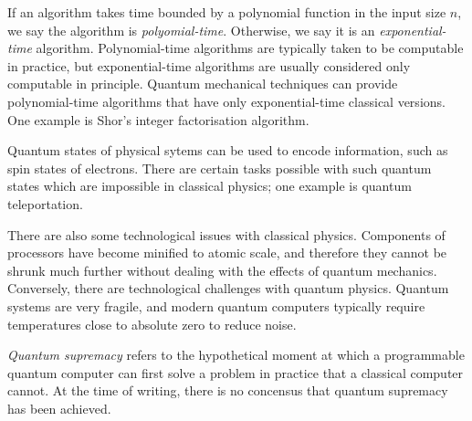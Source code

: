 If an algorithm takes time bounded by a polynomial function in the input size \( n \), we say the algorithm is \emph{polyomial-time}.
Otherwise, we say it is an \emph{exponential-time} algorithm.
Polynomial-time algorithms are typically taken to be computable in practice, but exponential-time algorithms are usually considered only computable in principle.
Quantum mechanical techniques can provide polynomial-time algorithms that have only exponential-time classical versions.
One example is Shor's integer factorisation algorithm.

Quantum states of physical sytems can be used to encode information, such as spin states of electrons.
There are certain tasks possible with such quantum states which are impossible in classical physics; one example is quantum teleportation.

There are also some technological issues with classical physics.
Components of processors have become minified to atomic scale, and therefore they cannot be shrunk much further without dealing with the effects of quantum mechanics.
Conversely, there are technological challenges with quantum physics.
Quantum systems are very fragile, and modern quantum computers typically require temperatures close to absolute zero to reduce noise.

\emph{Quantum supremacy} refers to the hypothetical moment at which a programmable quantum computer can first solve a problem in practice that a classical computer cannot.
At the time of writing, there is no concensus that quantum supremacy has been achieved.

